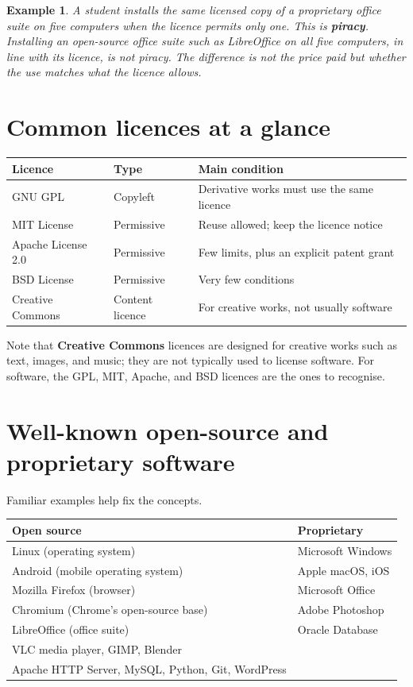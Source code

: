 \documentclass[11pt]{article}
\newtheorem{example}{Example}[section]
\begin{document}
\begin{example}
A student installs the same licensed copy of a proprietary office suite on
five computers when the licence permits only one. This is \textbf{piracy}.
Installing an open-source office suite such as LibreOffice on all five
computers, in line with its licence, is not piracy. The difference is not the
price paid but whether the use matches what the licence allows.
\end{example}

\section{Common licences at a glance}
\begin{center}
\begin{tabular}{p{}p{}p{}}
\toprule
\textbf{Licence} & \textbf{Type} & \textbf{Main condition} \\
\midrule
GNU GPL & Copyleft & Derivative works must use the same licence \\
MIT License & Permissive & Reuse allowed; keep the licence notice \\
Apache License 2.0 & Permissive & Few limits, plus an explicit patent grant \\
BSD License & Permissive & Very few conditions \\
Creative Commons & Content licence & For creative works, not usually software \\
\bottomrule
\end{tabular}
\end{center}

Note that \textbf{Creative Commons} licences are designed for creative works
such as text, images, and music; they are not typically used to license
software. For software, the GPL, MIT, Apache, and BSD licences are the ones to
recognise.

\section{Well-known open-source and proprietary software}
Familiar examples help fix the concepts.

\begin{center}
\begin{tabular}{p{}p{}}
\toprule
\textbf{Open source} & \textbf{Proprietary} \\
\midrule
Linux (operating system) & Microsoft Windows \\
Android (mobile operating system) & Apple macOS, iOS \\
Mozilla Firefox (browser) & Microsoft Office \\
Chromium (Chrome's open-source base) & Adobe Photoshop \\
LibreOffice (office suite) & Oracle Database \\
VLC media player, GIMP, Blender & \\
Apache HTTP Server, MySQL, Python, Git, WordPress & \\
\bottomrule
\end{tabular}
\end{center}
\end{document}

